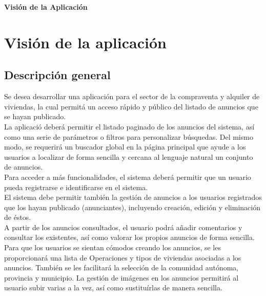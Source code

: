 \newpage{\pagestyle{empty}\cleardoublepage}
\newpage{\pagestyle{empty}\cleardoublepage}
\newpage
\vspace*{\fill}
    \begin{center}
      \thispagestyle{empty} \vspace*{0cm} \textbf{\huge
Visi\'{o}n de la Aplicaci\'{o}n}
    \end{center}
    \vspace*{\fill}
\newpage{\pagestyle{empty}\cleardoublepage}
\chapter{Visi\'{o}n de la aplicaci\'{o}n}
\section{Descripci\'{o}n general}


Se desea desarrollar una aplicaci\'{o}n para el sector de la compraventa y alquiler de viviendas, la cual permit\'{a} un acceso r\'{a}pido y p\'{u}blico del listado de anuncios que se hayan publicado. \\

La aplicaci\'{o} deber\'{a} permitir el listado paginado de los anuncios del sistema, as\'{i} como una serie de par\'{a}metros o filtros para personalizar b\'{u}squedas. Del mismo modo, se requerir\'{a} un buscador global en la p\'{a}gina principal que ayude a los usuarios a localizar de forma sencilla y cercana al lenguaje natural un conjunto de anuncios.\\

Para acceder a m\'{a}s funcionalidades, el sistema deber\'{a} permitir que un usuario pueda registrarse e identificarse en el sistema.\\

El sistema debe permitir tambi\'{e}n la gesti\'{o}n de anuncios a los usuarios registrados que los hayan publicado (anunciantes), incluyendo creaci\'{o}n, edici\'{o}n y eliminaci\'{o}n de \'{e}stos.\\

A partir de los anuncios consultados, el usuario podr\'{a} a\~{n}adir comentarios y consultar los existentes, as\'{i} como valorar los propios anuncios de forma sencilla.\\

Para que los usuarios se sientan c\'{o}modos creando los anuncios, se les proporcionar\'{a} una lista de Operaciones y tipos de viviendas asociadas a los anuncios. Tambi\'{e}n se les facilitar\'{a} la selecci\'{o}n de la comunidad aut\'{o}noma, provincia y municipio. La gesti\'{o}n de im\'{a}genes en los anuncios permitir\'{a} al usuario subir varias a la vez, as\'{i} como sustitu\'{i}rlas de manera sencilla.\\

